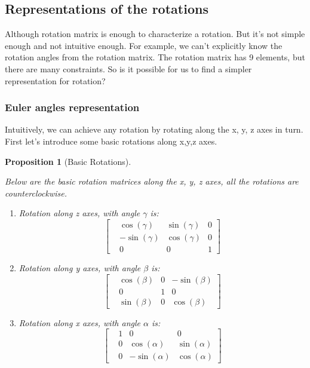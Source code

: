 \documentclass[
]{book}
\newtheorem{proposition}{Proposition}[chapter]
\theoremstyle{definition}
\theoremstyle{definition}
\theoremstyle{definition}
\theoremstyle{definition}
\theoremstyle{remark}
\begin{document}
\hypertarget{representations-of-the-rotations}{%
\subsection{Representations of the rotations}\label{representations-of-the-rotations}}

Although rotation matrix is enough to characterize a rotation. But it's not simple enough and not intuitive enough. For example, we can't explicitly know the rotation angles from the rotation matrix. The rotation matrix has 9 elements, but there are many constraints. So is it possible for us to find a simpler representation for rotation?

\hypertarget{euler-angles-representation}{%
\subsubsection{Euler angles representation}\label{euler-angles-representation}}

Intuitively, we can achieve any rotation by rotating along the x, y, z axes in turn. First let's introduce some basic rotations along x,y,z axes.

\begin{proposition}[Basic Rotations]
\protect\hypertarget{prp:basicrotation}{}\label{prp:basicrotation}

Below are the basic rotation matrices along the x, y, z axes, all the rotations are counterclockwise.

\begin{enumerate}
\def\labelenumi{\arabic{enumi}.}
\item
  Rotation along z axes, with angle \(\gamma\) is:
  \[\begin{bmatrix}
      &\cos(\gamma) &\sin(\gamma) &0\\
      &-\sin(\gamma) &\cos(\gamma) &0\\
      &0 &0 &1
  \end{bmatrix}\]
\item
  Rotation along y axes, with angle \(\beta\) is:
  \[\begin{bmatrix}
    &\cos(\beta) &0 &-\sin(\beta)\\
    &0 &1 &0\\
    &\sin(\beta) &0 &\cos(\beta)
  \end{bmatrix}\]
\item
  Rotation along x axes, with angle \(\alpha\) is:
  \[\begin{bmatrix}
    &1&0&0 \\
    &0 &\cos(\alpha) &\sin(\alpha)\\
    &0 &-\sin(\alpha) &\cos(\alpha)
  \end{bmatrix}\]
\end{enumerate}

\end{proposition}
\end{document}
